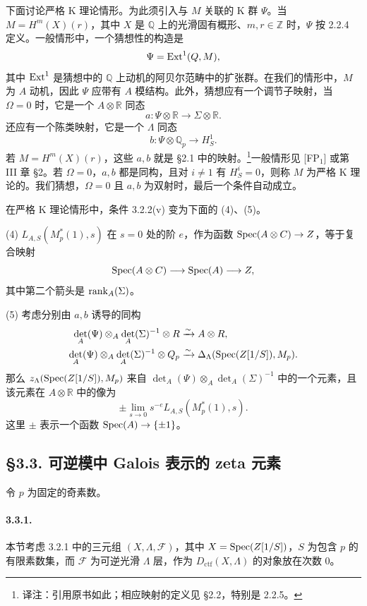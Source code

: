 下面讨论严格 K 理论情形。为此须引入与 $M$ 关联的 K 群 $\Psi$。当 $M=H^m(X)(r)$，其中 $X$ 是 $\mathbb Q$ 上的光滑固有概形、$m,r\in\mathbb Z$ 时，$\Psi$ 按 2.2.4 定义。一般情形中，一个猜想性的构造是
\[
 \Psi=\operatorname{Ext}^1(Q,M),
\]
其中 $\operatorname{Ext}^1$ 是猜想中的 $\mathbb Q$ 上动机的阿贝尔范畴中的扩张群。在我们的情形中，$M$ 为 $A$ 动机，因此 $\Psi$ 应带有 $A$ 模结构。此外，猜想应有一个调节子映射，当 $\Omega=0$ 时，它是一个 $A\otimes\mathbb R$ 同态
\[
 a:\Psi\otimes\mathbb R\longrightarrow\Sigma\otimes\mathbb R.
\]
还应有一个陈类映射，它是一个 $\Lambda$ 同态
\[
 b:\Psi\otimes\mathbb Q_p\longrightarrow H^1_S.
\]
若 $M=H^m(X)(r)$，这些 $a,b$ 就是 §2.1 中的映射。\footnote{译注：引用原书如此；相应映射的定义见 §2.2，特别是 2.2.5。}一般情形见 [FP$_1$] 或第 III 章 §2。若 $\Omega=0$，$a,b$ 都是同构，且对 $i\ne1$ 有 $H^i_S=0$，则称 $M$ 为严格 K 理论的。我们猜想，$\Omega=0$ 且 $a,b$ 为双射时，最后一个条件自动成立。

在严格 K 理论情形中，条件 3.2.2(v) 变为下面的 (4)、(5)。

\noindent(4) $L_{A,S}(M_p^*(1),s)$ 在 $s=0$ 处的阶 $e$，作为函数 $\operatorname{Spec}(A\otimes C)\to Z$，等于复合映射
\[
 \operatorname{Spec}(A\otimes C)\longrightarrow\operatorname{Spec}(A)\longrightarrow Z,
\]
其中第二个箭头是 $\operatorname{rank}_A(\Sigma)$。

\noindent(5) 考虑分别由 $a,b$ 诱导的同构
\begin{align*}
 \det_A(\Psi)\otimes_A\det_A(\Sigma)^{-1}\otimes R
 &\xrightarrow{\sim}A\otimes R,\\
 \det_A(\Psi)\otimes_A\det_A(\Sigma)^{-1}\otimes Q_p
 &\xrightarrow{\sim}\Delta_\Lambda(\operatorname{Spec}(Z[1/S]),M_p).
\end{align*}
那么 $z_\Lambda(\operatorname{Spec}(Z[1/S]),M_p)$ 来自 $\det_A(\Psi)\otimes_A\det_A(\Sigma)^{-1}$ 中的一个元素，且该元素在 $A\otimes\mathbb R$ 中的像为
\[
 \pm\lim_{s\to0}s^{-e}L_{A,S}(M_p^*(1),s).
\]
这里 $\pm$ 表示一个函数 $\operatorname{Spec}(A)\to\{\pm1\}$。

\subsection*{§3.3. 可逆模中 Galois 表示的 zeta 元素}
令 $p$ 为固定的奇素数。

\paragraph{3.3.1.} 本节考虑 3.2.1 中的三元组 $(X,\Lambda,\mathcal F)$，其中 $X=\operatorname{Spec}(Z[1/S])$，$S$ 为包含 $p$ 的有限素数集，而 $\mathcal F$ 为可逆光滑 $\Lambda$ 层，作为 $D_{\mathrm{ctf}}(X,\Lambda)$ 的对象放在次数 $0$。

